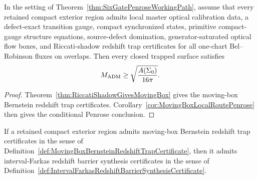 \begin{corollary}\label{cor:RiccatiShadowLocalRoutePenrose}
In the setting of Theorem~\ref{thm:SixGatePenroseWorkingPath}, assume that
every retained compact exterior region admits local master optical calibration
data, a defect-exact transition gauge, compact synchronized states, primitive
compact-gauge structure equations, source-defect domination,
generator-saturated optical flow boxes, and Riccati-shadow redshift trap
certificates for all one-chart Bel--Robinson fluxes on overlaps. Then every
closed trapped surface satisfies
\[
    M_{\mathrm{ADM}}\ge \sqrt{\frac{A(\Sigma_0)}{16\pi}} .
\]
\end{corollary}

\begin{proof}
Theorem~\ref{thm:RiccatiShadowGivesMovingBox} gives the moving-box Bernstein
redshift trap certificates.  Corollary~\ref{cor:MovingBoxLocalRoutePenrose}
then gives the conditional Penrose conclusion.
\end{proof}

\begin{theorem}\label{thm:MovingBoxBernsteinGivesIntervalFarkas}
If a retained compact exterior region admits moving-box Bernstein redshift trap
certificates in the sense of
Definition~\ref{def:MovingBoxBernsteinRedshiftTrapCertificate}, then it admits
interval-Farkas redshift barrier synthesis certificates in the sense of
Definition~\ref{def:IntervalFarkasRedshiftBarrierSynthesisCertificate}.
\end{theorem}

